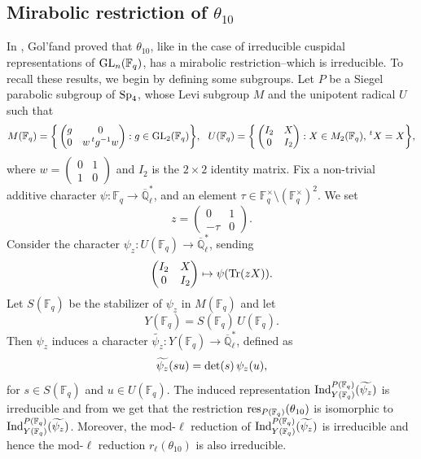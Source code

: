 \documentclass[10pt, reqno]{amsart}
\theoremstyle{plain}
\numberwithin{equation}{section} \newcommand{\di}{\operatorname{dim}}
\begin{document}
\subsection{Mirabolic restriction of $\theta_{10}$}
In \cite{Golfand_Sp4}, Gol'fand proved 
that $\theta_{10}$, like in the case 
of irreducible cuspidal representations 
of ${\rm GL}_n(\mathbb{F}_q)$, has a mirabolic
restriction--which is irreducible. 
To recall these results, we begin by defining some subgroups. 
 Let $P$ be a Siegel parabolic subgroup of 
${\rm Sp}_4$, whose Levi subgroup $M$ 
and the unipotent radical $U$ such that
$$ 
M(\mathbb{F}_q) = \bigg\{
\begin{pmatrix}
	g & 0\\
	0 & w\, ^tg^{-1}w
\end{pmatrix}: g\in {\rm GL}_2(\mathbb{F}_q)\bigg\},\,\,\,\,
U(\mathbb{F}_q) = \bigg\{
\begin{pmatrix}
	I_2 & X\\
	0 & I_2
\end{pmatrix}: X\in M_2(\mathbb{F}_q),\, ^tX=X\bigg\},
$$
where $w=
\begin{pmatrix}
	0 & 1\\
	1 & 0
\end{pmatrix}$ and $I_2$ is the $2\times 2$ 
identity matrix. Fix a non-trivial additive 
character $\psi:\mathbb{F}_q\rightarrow 
\overline{\mathbb{Q}}_\ell^\ast$,
and an element $\tau\in\mathbb{F}_q^\times\setminus (\mathbb{F}_q^\times)^2$. 
We set
$$z=\begin{pmatrix}
	0 & 1\\
	-\tau & 0
      \end{pmatrix}.$$ Consider the character
      $\psi_z:U(\mathbb{F}_q) \rightarrow
      \overline{\mathbb{Q}}_\ell^\ast$, sending
$$\begin{pmatrix}
	I_2 & X\\
	0 & I_2
\end{pmatrix}\mapsto \psi({\rm Tr}(zX)).$$
Let $S(\mathbb{F}_q)$ be the stabilizer of $\psi_z$ in
$M(\mathbb{F}_q)$ and let
$$Y(\mathbb{F}_q) = S(\mathbb{F}_q)\,U(\mathbb{F}_q).$$ 
Then $\psi_z$ induces a character
$\widetilde{\psi_z} : Y(\mathbb{F}_q)\rightarrow
\overline{\mathbb{Q}}_\ell^\ast$, defined as
$$ \widetilde{\psi_z}(su) = 
{\rm det}(s)\,\psi_z(u), $$ for $s\in S(\mathbb{F}_q)$ and
$u\in U(\mathbb{F}_q)$. The induced representation
${\rm Ind}_{Y(\mathbb{F}_q)}^{P(\mathbb{F}_q)} (\widetilde{\psi_z})$
is irreducible and from \cite[Proposition 1]{Golfand_Sp4} we get
that the restriction ${\rm res}_{P(\mathbb{F}_q)}(\theta_{10})$ is
isomorphic to
${\rm Ind}_{Y(\mathbb{F}_q)} ^{P(\mathbb{F}_q)}
(\widetilde{\psi_z})$. Moreover, the mod-$\ell$ reduction of
${\rm Ind}_{Y(\mathbb{F}_q)}^ {P(\mathbb{F}_q)} (\widetilde{\psi_z})$
is irreducible and hence the mod-$\ell$ reduction
$r_\ell(\theta_{10})$ is also irreducible.
\end{document}
